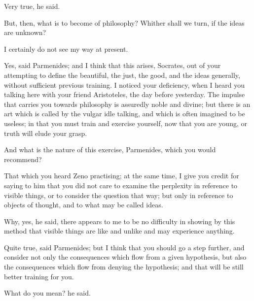 \documentclass[11pt,letter]{article}
\begin{document}
\par  Very true, he said.

\par  But, then, what is to become of philosophy? Whither shall we turn, if the ideas are unknown?

\par  I certainly do not see my way at present.

\par  Yes, said Parmenides; and I think that this arises, Socrates, out of your attempting to define the beautiful, the just, the good, and the ideas generally, without sufficient previous training. I noticed your deficiency, when I heard you talking here with your friend Aristoteles, the day before yesterday. The impulse that carries you towards philosophy is assuredly noble and divine; but there is an art which is called by the vulgar idle talking, and which is often imagined to be useless; in that you must train and exercise yourself, now that you are young, or truth will elude your grasp.

\par  And what is the nature of this exercise, Parmenides, which you would recommend?

\par  That which you heard Zeno practising; at the same time, I give you credit for saying to him that you did not care to examine the perplexity in reference to visible things, or to consider the question that way; but only in reference to objects of thought, and to what may be called ideas.

\par  Why, yes, he said, there appears to me to be no difficulty in showing by this method that visible things are like and unlike and may experience anything.

\par  Quite true, said Parmenides; but I think that you should go a step further, and consider not only the consequences which flow from a given hypothesis, but also the consequences which flow from denying the hypothesis; and that will be still better training for you.

\par  What do you mean? he said.
\end{document}
